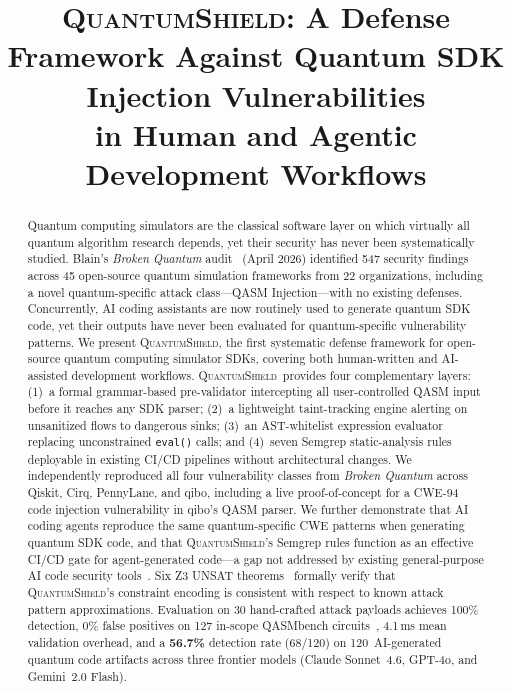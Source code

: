 \documentclass[conference,compsoc]{IEEEtran}
\newcommand{\tool}{\textsc{QuantumShield}}
\begin{document}
\title{\tool: A Defense Framework Against Quantum SDK Injection Vulnerabilities\\
in Human and Agentic Development Workflows}

\author{
}

\maketitle

\begin{abstract}
Quantum computing simulators are the classical software layer on which
virtually all quantum algorithm research depends, yet their security has
never been systematically studied.
Blain's \textit{Broken Quantum} audit~\cite{blain2026broken} (April 2026)
identified 547 security findings across 45 open-source quantum simulation
frameworks from 22 organizations, including a novel quantum-specific
attack class---QASM Injection---with no existing defenses.
Concurrently, AI coding assistants are now routinely used to generate
quantum SDK code, yet their outputs have never been evaluated for
quantum-specific vulnerability patterns.
We present \tool, the first systematic defense framework for open-source
quantum computing simulator SDKs, covering both human-written and
AI-assisted development workflows.
\tool\ provides four complementary layers:
(1)~a formal grammar-based pre-validator intercepting all user-controlled
QASM input before it reaches any SDK parser;
(2)~a lightweight taint-tracking engine alerting on unsanitized flows to
dangerous sinks;
(3)~an AST-whitelist expression evaluator replacing unconstrained
\texttt{eval()} calls; and
(4)~seven Semgrep static-analysis rules deployable in existing CI/CD
pipelines without architectural changes.
We independently reproduced all four vulnerability classes from
\textit{Broken Quantum} across Qiskit, Cirq, PennyLane, and qibo,
including a live proof-of-concept for a CWE-94 code injection
vulnerability in qibo's QASM parser.
We further demonstrate that AI coding agents reproduce the same
quantum-specific CWE patterns when generating quantum SDK code, and
that \tool's Semgrep rules function as an effective CI/CD gate for
agent-generated code---a gap not addressed by existing general-purpose
AI code security tools~\cite{bbd2026,vibeguard2026}.
Six Z3 UNSAT theorems~\cite{demoura2008z3} formally verify that \tool's
constraint encoding is consistent with respect to known attack pattern
approximations.
Evaluation on 30 hand-crafted attack payloads achieves 100\% detection,
0\% false positives on 127 in-scope QASMbench circuits~\cite{li2022qasmbench},
4.1\,ms mean validation overhead, and a \textbf{56.7\%} detection rate (68/120) on
120~AI-generated quantum code artifacts across three frontier models
(Claude Sonnet~4.6, GPT-4o, and Gemini~2.0 Flash).
\end{abstract}
\end{document}
